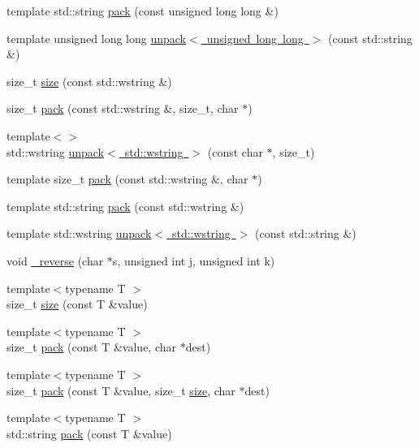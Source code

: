 \begin{DoxyCompactItemize}
\item 
template std\+::string \mbox{\hyperlink{namespaceebml_a4792d18415e00b078131b9590e832b9b}{pack}} (const unsigned long long \&)
\item 
template unsigned long long \mbox{\hyperlink{namespaceebml_a5ed4cbd5d003214f9e309b89ef17d630}{unpack$<$ unsigned long long $>$}} (const std\+::string \&)
\item 
size\+\_\+t \mbox{\hyperlink{namespaceebml_ab52135bc5dd3c3195dfc839bc8b551fd}{size}} (const std\+::wstring \&)
\item 
size\+\_\+t \mbox{\hyperlink{namespaceebml_afe17a10f5bbba38018c292f620088230}{pack}} (const std\+::wstring \&, size\+\_\+t, char $\ast$)
\item 
{\footnotesize template$<$$>$ }\\std\+::wstring \mbox{\hyperlink{namespaceebml_afe61c84674c5ceeaf4d19fa2f994e37b}{unpack$<$ std\+::wstring $>$}} (const char $\ast$, size\+\_\+t)
\item 
template size\+\_\+t \mbox{\hyperlink{namespaceebml_ac0fc71c240d5809912675751dc1644bf}{pack}} (const std\+::wstring \&, char $\ast$)
\item 
template std\+::string \mbox{\hyperlink{namespaceebml_ab3177fa4c2fceef733358b336d5792db}{pack}} (const std\+::wstring \&)
\item 
template std\+::wstring \mbox{\hyperlink{namespaceebml_afaec55e41b1bac6c33abe9b8707d489b}{unpack$<$ std\+::wstring $>$}} (const std\+::string \&)
\item 
void \mbox{\hyperlink{namespaceebml_ac1a0abdc17f3f647cf7d1fa990622b89}{\+\_\+reverse}} (char $\ast$s, unsigned int j, unsigned int k)
\item 
{\footnotesize template$<$typename T $>$ }\\size\+\_\+t \mbox{\hyperlink{namespaceebml_a0385005834de08a2401ec491023f9ab3}{size}} (const T \&value)
\item 
{\footnotesize template$<$typename T $>$ }\\size\+\_\+t \mbox{\hyperlink{namespaceebml_a902c75e723a22780c779a3fc1531a07f}{pack}} (const T \&value, char $\ast$dest)
\item 
{\footnotesize template$<$typename T $>$ }\\size\+\_\+t \mbox{\hyperlink{namespaceebml_a2ca9fdcd493e677f02886593a4ae63e0}{pack}} (const T \&value, size\+\_\+t \mbox{\hyperlink{namespaceebml_a75eaf24de9c90584c60e27de3b1dd63e}{size}}, char $\ast$dest)
\item 
{\footnotesize template$<$typename T $>$ }\\std\+::string \mbox{\hyperlink{namespaceebml_a8cf030e141b95cd742c465794a8faf02}{pack}} (const T \&value)

\end{DoxyCompactItemize}
